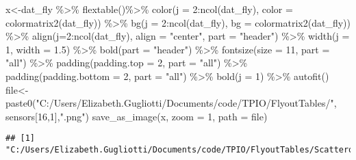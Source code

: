 \documentclass[
]{article}
\newenvironment{Shaded}{\begin{snugshade}}{\end{snugshade}}
\newcommand{\AttributeTok}[1]{\textcolor[rgb]{0.77,0.63,0.00}{#1}}
\newcommand{\DecValTok}[1]{\textcolor[rgb]{0.00,0.00,0.81}{#1}}
\newcommand{\FloatTok}[1]{\textcolor[rgb]{0.00,0.00,0.81}{#1}}
\newcommand{\FunctionTok}[1]{\textcolor[rgb]{0.00,0.00,0.00}{#1}}
\newcommand{\NormalTok}[1]{#1}
\newcommand{\OtherTok}[1]{\textcolor[rgb]{0.56,0.35,0.01}{#1}}
\newcommand{\SpecialCharTok}[1]{\textcolor[rgb]{0.00,0.00,0.00}{#1}}
\newcommand{\StringTok}[1]{\textcolor[rgb]{0.31,0.60,0.02}{#1}}
\begin{document}
\begin{Shaded}
\begin{Highlighting}[]
\NormalTok{x}\OtherTok{\textless{}{-}}\NormalTok{dat\_fly }\SpecialCharTok{\%\textgreater{}\%}
    \FunctionTok{flextable}\NormalTok{()}\SpecialCharTok{\%\textgreater{}\%}
    \FunctionTok{color}\NormalTok{(}\AttributeTok{j =} \DecValTok{2}\SpecialCharTok{:}\FunctionTok{ncol}\NormalTok{(dat\_fly), }\AttributeTok{color =} \FunctionTok{colormatrix2}\NormalTok{(dat\_fly)) }\SpecialCharTok{\%\textgreater{}\%}
    \FunctionTok{bg}\NormalTok{(}\AttributeTok{j =} \DecValTok{2}\SpecialCharTok{:}\FunctionTok{ncol}\NormalTok{(dat\_fly), }\AttributeTok{bg =} \FunctionTok{colormatrix2}\NormalTok{(dat\_fly)) }\SpecialCharTok{\%\textgreater{}\%}
    \FunctionTok{align}\NormalTok{(}\AttributeTok{j=}\DecValTok{2}\SpecialCharTok{:}\FunctionTok{ncol}\NormalTok{(dat\_fly), }\AttributeTok{align =} \StringTok{"center"}\NormalTok{, }\AttributeTok{part =} \StringTok{"header"}\NormalTok{) }\SpecialCharTok{\%\textgreater{}\%}
    \FunctionTok{width}\NormalTok{(}\AttributeTok{j =} \DecValTok{1}\NormalTok{, }\AttributeTok{width =} \FloatTok{1.5}\NormalTok{) }\SpecialCharTok{\%\textgreater{}\%}
    \FunctionTok{bold}\NormalTok{(}\AttributeTok{part =} \StringTok{"header"}\NormalTok{) }\SpecialCharTok{\%\textgreater{}\%}
    \FunctionTok{fontsize}\NormalTok{(}\AttributeTok{size =} \DecValTok{11}\NormalTok{, }\AttributeTok{part =} \StringTok{"all"}\NormalTok{) }\SpecialCharTok{\%\textgreater{}\%}
    \FunctionTok{padding}\NormalTok{(}\AttributeTok{padding.top =} \DecValTok{2}\NormalTok{, }\AttributeTok{part =} \StringTok{"all"}\NormalTok{) }\SpecialCharTok{\%\textgreater{}\%}
    \FunctionTok{padding}\NormalTok{(}\AttributeTok{padding.bottom =} \DecValTok{2}\NormalTok{, }\AttributeTok{part =} \StringTok{"all"}\NormalTok{) }\SpecialCharTok{\%\textgreater{}\%}
    \FunctionTok{bold}\NormalTok{(}\AttributeTok{j =} \DecValTok{1}\NormalTok{) }\SpecialCharTok{\%\textgreater{}\%} \FunctionTok{autofit}\NormalTok{()}
\NormalTok{file}\OtherTok{\textless{}{-}}\FunctionTok{paste0}\NormalTok{(}\StringTok{"C:/Users/Elizabeth.Gugliotti/Documents/code/TPIO/FlyoutTables/"}\NormalTok{, sensors[}\DecValTok{16}\NormalTok{,}\DecValTok{1}\NormalTok{],}\StringTok{".png"}\NormalTok{)}
\FunctionTok{save\_as\_image}\NormalTok{(x, }\AttributeTok{zoom =} \DecValTok{1}\NormalTok{, }\AttributeTok{path =}\NormalTok{ file)}
\end{Highlighting}
\end{Shaded}

\begin{verbatim}
## [1] "C:/Users/Elizabeth.Gugliotti/Documents/code/TPIO/FlyoutTables/Scatterometer.png"
\end{verbatim}
\end{document}
